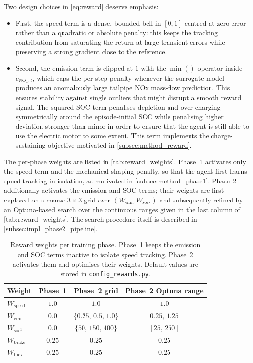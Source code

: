 Two design choices in \autoref{eq:reward} deserve emphasis:
\begin{itemize}
  \item First, the speed term is a dense, bounded bell in $[0,1]$ centred at zero error rather than a quadratic or absolute penalty: this keeps the tracking contribution from saturating the return at large transient errors while preserving a strong gradient close to the reference.
  \item Second, the emission term is clipped at $1$ with the $\min()$ operator inside $\tilde e_{\mathrm{NO}_{x},t}$, which caps the per-step penalty whenever the surrogate model produces an anomalously large tailpipe \ac{NOx} mass-flow prediction. This ensures stability against single outliers that might disrupt a smooth reward signal. The squared \ac{SOC} term penalises depletion and over-charging symmetrically around the episode-initial \ac{SOC} while penalising higher deviation stronger than minor in order to ensure that the agent is still able to use the electric motor to some extent. This term implements the charge-sustaining objective motivated in \autoref{subsec:method_reward}.
\end{itemize}

The per-phase weights are listed in \autoref{tab:reward_weights}. Phase~1 activates only the speed term and the mechanical shaping penalty, so that the agent first learns speed tracking in isolation, as motivated in \autoref{subsec:method_phase1}. Phase~2 additionally activates the emission and \ac{SOC} terms; their weights are first explored on a coarse $3\!\times\!3$ grid over $(W_{\text{emi}}, W_{\text{soc}^2})$ and subsequently refined by an Optuna-based search over the continuous ranges given in the last column of \autoref{tab:reward_weights}. The search procedure itself is described in \autoref{subsec:impl_phase2_pipeline}.

\begin{table}[H]
  \centering
  \small
  \begin{tabular}{|l|c|c|c|}
    \hline
    \textbf{Weight} & \textbf{Phase~1} & \textbf{Phase~2 grid} & \textbf{Phase~2 Optuna range} \\
    \hline
    $W_{\text{speed}}$ & $1.0$  & $1.0$                  & $1.0$ \\
    $W_{\text{emi}}$   & $0.0$  & $\{0.25,\,0.5,\,1.0\}$ & $[0.25,\,1.25]$ \\
    $W_{\text{soc}^2}$ & $0.0$  & $\{50,\,150,\,400\}$   & $[25,\,250]$ \\
    $W_{\text{brake}}$ & $0.25$ & $0.25$                 & $0.25$ \\
    $W_{\text{flick}}$ & $0.25$ & $0.25$                 & $0.25$ \\
    \hline
  \end{tabular}
  \caption[Reward weights per training phase]{Reward weights per training phase. Phase~1 keeps the emission and SOC terms inactive to isolate speed tracking. Phase~2 activates them and optimises their weights. Default values are stored in \texttt{config\_rewards.py}.}
  \label{tab:reward_weights}
\end{table}

